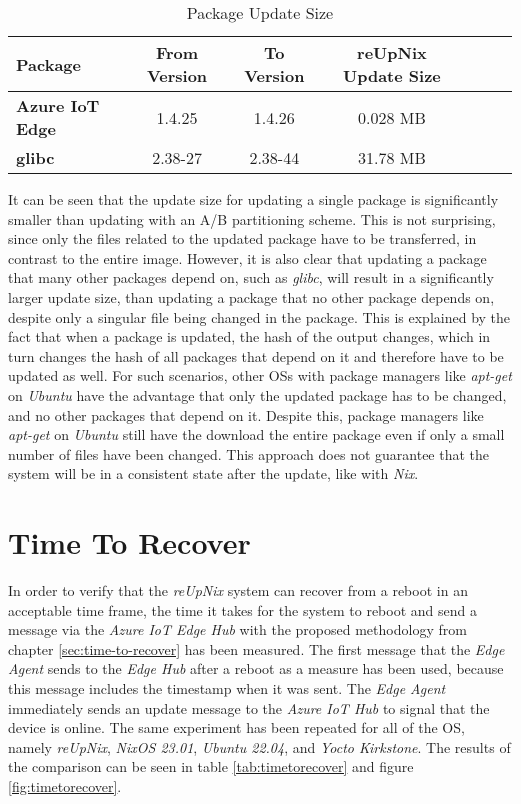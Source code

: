 \begin{table}[H]
	\centering
  \footnotesize
	\begin{tabular}{l|c|c|c|c|c|c}
	\toprule
	 Package & From Version & To Version & reUpNix Update Size \\
	\midrule
    \textbf{Azure IoT Edge} & 1.4.25 & 1.4.26 & 0.028 MB \\
    \textbf{glibc} & 2.38-27 & 2.38-44 & 31.78 MB  \\
	\bottomrule
	\end{tabular}
	\caption{Package Update Size}
	\label{tab:package-update-size}
\end{table}

\noindent
It can be seen that the update size for updating a single package is significantly
smaller than updating with an A/B partitioning scheme. This is not surprising,
since only the files related to the updated package have to be transferred, in
contrast to the entire image. However, it is also clear that updating a package
that many other packages depend on, such as \textit{glibc}, will result in a
significantly larger update size, than updating a package that no other package
depends on, despite only a singular file being changed in the package.
This is explained by the fact that when a package is updated, the hash of the
output changes, which in turn changes the hash of all packages that depend on it
and therefore have to be updated as well.
For such scenarios, other \ac{OS}s with package managers like \textit{apt-get}
on \textit{Ubuntu} have the advantage that only the updated package has to be
changed, and no other packages that depend on it. Despite this, package managers
like \textit{apt-get} on \textit{Ubuntu} still have the download the entire package
even if only a small number of files have been changed. This approach does
not guarantee that the system will be in a consistent state after the update,
like with \textit{Nix}.

\section{Time To Recover}
In order to verify that the \textit{reUpNix} system can recover from a reboot
in an acceptable time frame, the time it takes for the system to
reboot and send a message via the \textit{Azure IoT Edge Hub} with the proposed
methodology from chapter \ref{sec:time-to-recover} has been measured. The first message
that the \textit{Edge Agent} sends to the \textit{Edge Hub} after a reboot as
a measure has been used, because this message includes the timestamp when it was sent.
The \textit{Edge Agent} immediately sends an update message to the \textit{Azure
IoT Hub} to signal that the device is online. The same experiment has been repeated
for all of the \ac{OS}, namely \textit{reUpNix}, \textit{NixOS 23.01},
\textit{Ubuntu 22.04}, and \textit{Yocto Kirkstone}. The results of the comparison
can be seen in table \ref{tab:timetorecover} and figure \ref{fig:timetorecover}.


